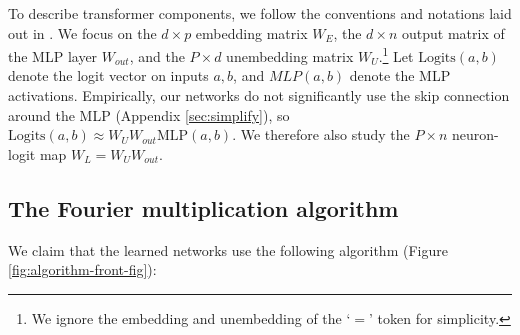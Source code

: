 \documentclass{article} %
\newcommand{\cosp}[1]{\cos \left ( #1 \right )}
\newcommand{\MLP}{\textrm{MLP}}
\begin{document}
\label{sec:notation}
To describe transformer components, we follow the conventions and notations laid out in \cite{elhage2021mathematical}. We focus on the $d \times p$ embedding matrix $W_E$, the $d \times n$ output matrix of the MLP layer $W_{out}$, and the $P \times d$ unembedding matrix $W_U$.\footnote{We ignore the embedding and unembedding of the `$=$' token for simplicity.} 
Let $\textrm{Logits}(a,b)$ denote the logit vector on inputs $a, b$, and $MLP(a,b)$ denote the MLP activations. Empirically, our networks do not significantly use the skip connection around the MLP (Appendix \ref{sec:simplify}), so $\textrm{Logits}(a,b) \approx W_UW_{out}\MLP(a,b)$.
We therefore also study the $P \times n$ neuron-logit map $W_{L}=W_UW_{out}$. %

\subsection{The Fourier multiplication algorithm}
\label{sec:fourier-algorithm}
We claim that the learned networks use the following algorithm (Figure \ref{fig:algorithm-front-fig}):
\end{document}
